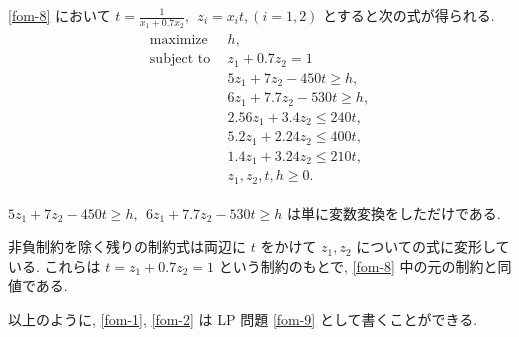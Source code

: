 \documentclass[uplatex, a4j, 11pt, fleqn, dvipdfmx]{article}
\begin{document}
\eqref{fom-8} において $t = \frac{1}{x_1 + 0.7 x_2}, ~~ z_i = x_i t, (i = 1, 2)$ とすると次の式が得られる.
\begin{align}
	\begin{aligned}
		\text{maximize} ~~
		 & h,
		\\
		\text{subject to} ~~
		 & z_1 + 0.7 z_2 = 1
		\\
		 & 5 z_1 + 7 z_2 - 450 t \geq h,
		\\
		 & 6 z_1 + 7.7 z_2 - 530 t \geq h,
		\\
		 & 2.56 z_1 + 3.4 z_2 \leq 240 t,
		\\
		 & 5.2 z_1 + 2.24 z_2 \leq 400 t,
		\\
		 & 1.4 z_1 + 3.24 z_2 \leq 210 t,
		\\
		 & z_1, z_2, t, h \geq 0.
	\end{aligned}
	\label{fom-9}
\end{align}

$5 z_1 + 7 z_2 - 450 t \geq h, ~~ 6 z_1 + 7.7 z_2 - 530 t \geq h$ は単に変数変換をしただけである.

非負制約を除く残りの制約式は両辺に $t$ をかけて $z_1, z_2$ についての式に変形している.
これらは $t = z_1 + 0.7 z_2 = 1$ という制約のもとで, \eqref{fom-8} 中の元の制約と同値である.

以上のように, \eqref{fom-1}, \eqref{fom-2} は LP 問題 \eqref{fom-9} として書くことができる.
\end{document}
